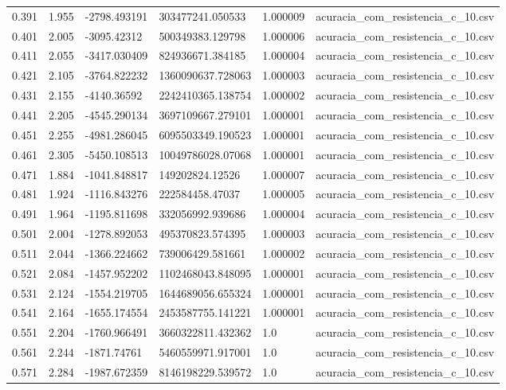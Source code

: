 \begin{table}
\begin{tabular}{llllll}
0.391 & 1.955 & -2798.493191 & 303477241.050533 & 1.000009 & acuracia\_com\_resistencia\_c\_10.csv \\
0.401 & 2.005 & -3095.42312 & 500349383.129798 & 1.000006 & acuracia\_com\_resistencia\_c\_10.csv \\
0.411 & 2.055 & -3417.030409 & 824936671.384185 & 1.000004 & acuracia\_com\_resistencia\_c\_10.csv \\
0.421 & 2.105 & -3764.822232 & 1360090637.728063 & 1.000003 & acuracia\_com\_resistencia\_c\_10.csv \\
0.431 & 2.155 & -4140.36592 & 2242410365.138754 & 1.000002 & acuracia\_com\_resistencia\_c\_10.csv \\
0.441 & 2.205 & -4545.290134 & 3697109667.279101 & 1.000001 & acuracia\_com\_resistencia\_c\_10.csv \\
0.451 & 2.255 & -4981.286045 & 6095503349.190523 & 1.000001 & acuracia\_com\_resistencia\_c\_10.csv \\
0.461 & 2.305 & -5450.108513 & 10049786028.07068 & 1.000001 & acuracia\_com\_resistencia\_c\_10.csv \\
0.471 & 1.884 & -1041.848817 & 149202824.12526 & 1.000007 & acuracia\_com\_resistencia\_c\_10.csv \\
0.481 & 1.924 & -1116.843276 & 222584458.47037 & 1.000005 & acuracia\_com\_resistencia\_c\_10.csv \\
0.491 & 1.964 & -1195.811698 & 332056992.939686 & 1.000004 & acuracia\_com\_resistencia\_c\_10.csv \\
0.501 & 2.004 & -1278.892053 & 495370823.574395 & 1.000003 & acuracia\_com\_resistencia\_c\_10.csv \\
0.511 & 2.044 & -1366.224662 & 739006429.581661 & 1.000002 & acuracia\_com\_resistencia\_c\_10.csv \\
0.521 & 2.084 & -1457.952202 & 1102468043.848095 & 1.000001 & acuracia\_com\_resistencia\_c\_10.csv \\
0.531 & 2.124 & -1554.219705 & 1644689056.655324 & 1.000001 & acuracia\_com\_resistencia\_c\_10.csv \\
0.541 & 2.164 & -1655.174554 & 2453587755.141221 & 1.000001 & acuracia\_com\_resistencia\_c\_10.csv \\
0.551 & 2.204 & -1760.966491 & 3660322811.432362 & 1.0 & acuracia\_com\_resistencia\_c\_10.csv \\
0.561 & 2.244 & -1871.74761 & 5460559971.917001 & 1.0 & acuracia\_com\_resistencia\_c\_10.csv \\
0.571 & 2.284 & -1987.672359 & 8146198229.539572 & 1.0 & acuracia\_com\_resistencia\_c\_10.csv \\

\end{tabular}
\end{table}
